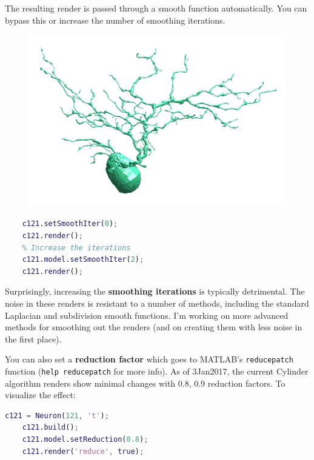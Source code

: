 \documentclass[12pt]{exam}
\begin{document}
	The resulting render is passed through a smooth function automatically. You can bypass this or increase the number of smoothing iterations.\\
	\begin{figure}
		\includegraphics[width=\linewidth]{c6_render}
		\label{c6render}
	\end{figure}
	\begin{lstlisting}[language=matlab]
	% No smoothing
	c121.setSmoothIter(0);
	c121.render();
	% Increase the iterations
	c121.model.setSmoothIter(2); 
	c121.render();\end{lstlisting}
	Surprisingly, increasing the \textbf{smoothing iterations} is typically detrimental. The noise in these renders is resistant to a number of methods, including the standard Laplacian and subdivision smooth functions. I'm working on more advanced methods for smoothing out the renders (and on creating them with less noise in the first place).
	
	You can also set a \textbf{reduction factor} which goes to MATLAB's \texttt{reducepatch} function (\texttt{help reducepatch} for more info). As of 3Jan2017, the current Cylinder algorithm renders show minimal changes with 0.8, 0.9 reduction factors. To visualize the effect:
	\begin{lstlisting}[language=matlab]
	c121 = Neuron(121, 't');
	c121.build();
	c121.model.setReduction(0.8);
	c121.render('reduce', true);\end{lstlisting}
	
\end{document}
